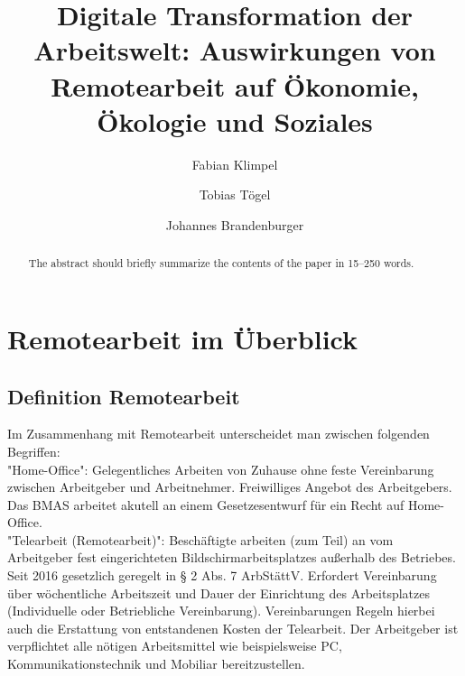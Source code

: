 \documentclass[runningheads]{llncs}
\begin{document}
\title{Digitale Transformation der Arbeitswelt: Auswirkungen von Remotearbeit auf Ökonomie, Ökologie und Soziales}


\author{Fabian Klimpel\orcidID{} \and
Tobias Tögel\orcidID{} \and
Johannes Brandenburger\orcidID{}}
%


\maketitle

\begin{abstract}
The abstract should briefly summarize the contents of the paper in
15--250 words.


\end{abstract}

\section{Remotearbeit im Überblick}

\subsection{Definition Remotearbeit}

Im Zusammenhang mit Remotearbeit unterscheidet man zwischen folgenden Begriffen:\\ 

"Home-Office": Gelegentliches Arbeiten von Zuhause ohne feste Vereinbarung zwischen Arbeitgeber und Arbeitnehmer\cite{Lenz}. Freiwilliges Angebot des Arbeitgebers\cite{Lenz}. Das BMAS arbeitet akutell an einem Gesetzesentwurf für ein Recht auf Home-Office\cite{Lenz}.\\ 

"Telearbeit (Remotearbeit)": Beschäftigte arbeiten (zum Teil) an vom Arbeitgeber fest eingerichteten Bildschirmarbeitsplatzes außerhalb des Betriebes. Seit 2016 gesetzlich geregelt in § 2 Abs. 7 ArbStättV\cite{bundestag}. Erfordert Vereinbarung über wöchentliche Arbeitszeit und Dauer der Einrichtung des Arbeitsplatzes (Individuelle oder Betriebliche Vereinbarung)\cite{vbg23}. Vereinbarungen Regeln hierbei auch die Erstattung von entstandenen Kosten der Telearbeit\cite{vbg23}. Der Arbeitgeber ist verpflichtet alle nötigen Arbeitsmittel wie beispielsweise PC, Kommunikationstechnik und Mobiliar bereitzustellen\cite{vbg23}.\\    
\end{document}

